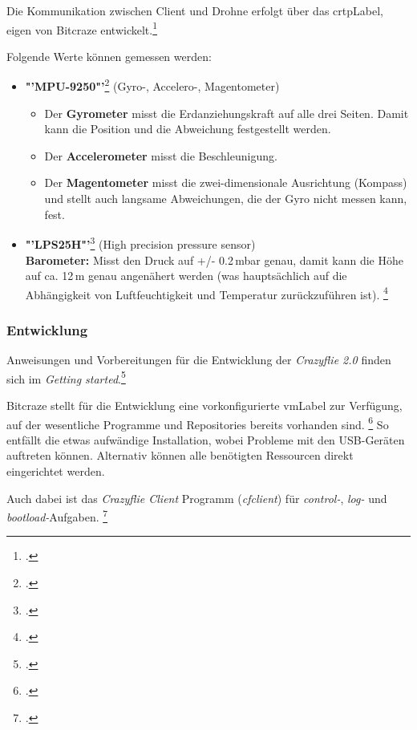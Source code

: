 Die Kommunikation zwischen Client und Drohne erfolgt über das \gls{crtpLabel}, eigen von Bitcraze entwickelt.\footcite{doc_crazyflie_crtp_index_Bitcraze_Wiki_2015-03-30}

Folgende Werte können gemessen werden:
\begin{itemize}
	\item \textbf{"'MPU-9250"'}\footcite{MEMS_Gyro-Accel_Gyroscope_Accelerometer_Processing_-_MPU-9250_Nine-Axis_2015-03-30} (Gyro-, Accelero-, Magentometer)
	\begin{itemize}
		\item Der \textbf{Gyrometer} misst die Erdanziehungskraft auf alle drei Seiten. Damit kann die Position und die Abweichung festgestellt werden.
		\item Der \textbf{Accelerometer} misst die Beschleunigung.
		\item Der \textbf{Magentometer} misst die zwei-dimensionale Ausrichtung (Kompass) und stellt auch langsame Abweichungen, die der Gyro nicht messen kann, fest.
	\end{itemize}
	\item \textbf{"'LPS25H"'}\footcite{Class-Leading_Miniature_Pressure_Sensor_from_STMicroelectronics_Powers_New_Chapter_in_Mobile_Innovation_2015-03-30} (High precision pressure sensor)\\
	\textbf{Barometer:} Misst den Druck auf +/- 0.2\,mbar genau, damit kann die Höhe auf ca. 12\,m genau angenähert werden (was hauptsächlich auf die Abhängigkeit von Luftfeuchtigkeit und Temperatur zurückzuführen ist).
	\footcite{Barometrische_Hoehenformel__Wikipedia_2015-03-30}
\end{itemize}

\subsubsection{Entwicklung}
Anweisungen und Vorbereitungen für die Entwicklung der \textit{Crazyflie 2.0} finden sich im \textit{Getting started}.\footcite{doc_crazyflie_dev:starting_Bitcraze_Wiki_2015-03-29}

Bitcraze stellt für die Entwicklung eine vorkonfigurierte \gls{vmLabel} zur Verfügung, auf der wesentliche Programme und Repositories bereits vorhanden sind.
\footcite{projects_virtualmachine_index_Bitcraze_Wiki_2015-03-30}
So entfällt die etwas aufwändige Installation, wobei Probleme mit den USB-Geräten auftreten können. Alternativ können alle benötigten Ressourcen direkt eingerichtet werden.

Auch dabei ist das \textit{Crazyflie Client} Programm (\textit{cfclient}) für \textit{control-}, \textit{log-} und \textit{bootload-}Aufgaben.
\footcite{doc_crazyflie_client_pycfclient_index_Bitcraze_Wiki_2015-03-30}

